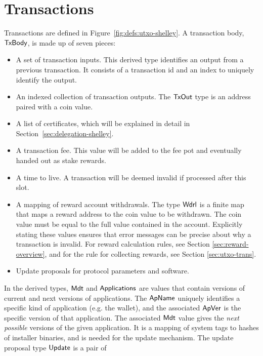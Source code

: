 \section{Transactions}
\label{sec:transactions}

Transactions are defined in Figure~\ref{fig:defs:utxo-shelley}.
A transaction body, $\mathsf{TxBody}$, is made up of seven pieces:

\begin{itemize}
  \item A set of transaction inputs.
    This derived type identifies an output from a previous transaction.
    It consists of a transaction id and an index to uniquely identify the output.
  \item An indexed collection of transaction outputs.
    The $\mathsf{TxOut}$ type is an address paired with a coin value.
  \item A list of certificates, which will be explained in detail in
    Section~\ref{sec:delegation-shelley}.
  \item A transaction fee. This value will be added to the fee pot and eventually handed out
    as stake rewards.
  \item A time to live. A transaction will be deemed invalid if processed after this slot.
  \item A mapping of reward account withdrawals.  The type $\mathsf{Wdrl}$ is a finite map that maps
    a reward address to the coin value to be withdrawn. The coin value must be equal
    to the full value contained in the account. Explicitly stating these values ensures
    that error messages can be precise about why a transaction is invalid.
    For reward calculation rules, see Section \ref{sec:reward-overview},
    and for the rule for collecting rewards, see Section \ref{sec:utxo-trans}.
  \item Update proposals for protocol parameters and software.
\end{itemize}

In the derived types, $\mathsf{Mdt}$ and $\mathsf{Applications}$ are values
that contain versions of current and next versions of applications.
The $\mathsf{ApName}$ uniquely identifies a specific kind of application (e.g.
the wallet), and the associated $\mathsf{ApVer}$ is the specific version of that
application. The associated $\mathsf{Mdt}$ value gives the \textit{next possible}
versions of the given application. It is a mapping of system tags to hashes of
installer binaries, and is needed for the update mechanism.
The update proposal type $\mathsf{Update}$ is a pair of

